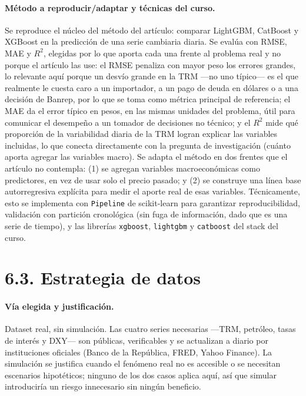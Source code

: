 \documentclass[11pt,letterpaper]{article}
\begin{document}
  \paragraph{Método a reproducir/adaptar y técnicas del curso.} Se reproduce el núcleo del método del artículo: comparar LightGBM, CatBoost y XGBoost en la predicción de una serie cambiaria diaria. Se evalúa con RMSE, MAE y $R^2$, elegidas por lo que aporta cada una frente al problema real y no porque el artículo las use: el RMSE penaliza con mayor peso los errores grandes, lo relevante aquí porque un desvío grande en la TRM ---no uno típico--- es el que realmente le cuesta caro a un importador, a un pago de deuda en dólares o a una decisión de Banrep, por lo que se toma como métrica principal de referencia; el MAE da el error típico en pesos, en las mismas unidades del problema, útil para comunicar el desempeño a un tomador de decisiones no técnico; y el $R^2$ mide qué proporción de la variabilidad diaria de la TRM logran explicar las variables incluidas, lo que conecta directamente con la pregunta de investigación (cuánto aporta agregar las variables macro). Se adapta el método en dos frentes que el artículo no contempla: (1) se agregan variables macroeconómicas como predictores, en vez de usar solo el precio pasado; y (2) se construye una línea base autorregresiva explícita para medir el aporte real de esas variables. Técnicamente, esto se implementa con \texttt{Pipeline} de scikit-learn para garantizar reproducibilidad, validación con partición cronológica (sin fuga de información, dado que es una serie de tiempo), y las librerías \texttt{xgboost}, \texttt{lightgbm} y \texttt{catboost} del stack del curso.

  \section*{6.3. Estrategia de datos}

  \paragraph{Vía elegida y justificación.} Dataset real, sin simulación. Las cuatro series necesarias ---TRM, petróleo, tasas de interés y DXY--- son públicas, verificables y se actualizan a diario por instituciones oficiales (Banco de la República, FRED, Yahoo Finance). La simulación se justifica cuando el fenómeno real no es accesible o se necesitan escenarios hipotéticos; ninguno de los dos casos aplica aquí, así que simular introduciría un riesgo innecesario sin ningún beneficio.
\end{document}
